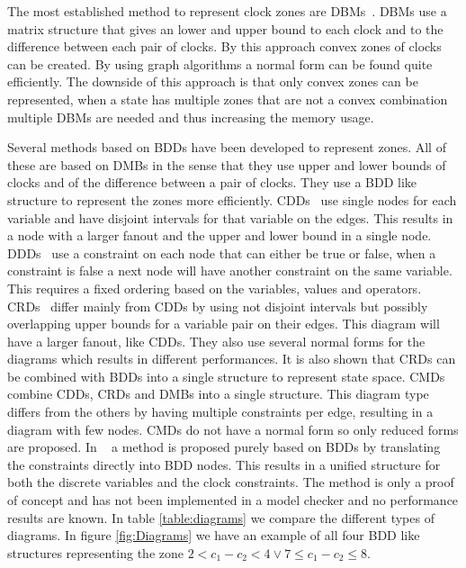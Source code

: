 \documentclass[11pt]{article}
\begin{document}
The most established method to represent clock zones are DBMs~\cite{dbmorig, bengtsson2002clocks}. DBMs use a matrix structure that gives an lower and upper bound to each clock and to the difference between each pair of clocks. By this approach convex zones of clocks can be created. By using graph algorithms a normal form can be found quite efficiently. The downside of this approach is that only convex zones can be represented, when a state has multiple zones that are not a convex combination multiple DBMs are needed and thus increasing the memory usage. 

Several methods based on BDDs have been developed to represent zones. All of these are based on DMBs in the sense that they use upper and lower bounds of clocks and of the difference between a pair of clocks. They use a BDD like structure to represent the zones more efficiently. CDDs~\cite{BRICS19491} use single nodes for each variable and have disjoint intervals for that variable on the edges. This results in a node with a larger fanout and the upper and lower bound in a single node. DDDs~\cite{ddds, ddd-datastructure-99} use a constraint on each node that can either be true or false, when a constraint is false a next node will have another constraint on the same variable. This requires a fixed ordering based on the variables, values and operators. CRDs~\cite{crds} differ mainly from CDDs by using not disjoint intervals but possibly overlapping upper bounds for a variable pair on their edges. This diagram will have a larger fanout, like CDDs. They also use several normal forms for the diagrams which results in different performances. It is also shown that CRDs can be combined with BDDs into a single structure to represent state space. CMDs~\cite{5702245} combine CDDs, CRDs and DMBs into a single structure. This diagram type differs from the others by having multiple constraints per edge, resulting in a diagram with few nodes. CMDs do not have a normal form so only reduced forms are proposed. In ~\cite{7098276, 7184781} a method is proposed purely based on BDDs by translating the constraints directly into BDD nodes. This results in a unified structure for both the discrete variables and the clock constraints. The method is only a proof of concept and has not been implemented in a model checker and no performance results are known. In table \ref{table:diagrams} we compare the different types of diagrams. In figure \ref{fig:Diagrams} we have an example of all four BDD like structures representing the zone $2 < c_1 - c_2 < 4 \vee 7 \leq c_1 - c_2 \leq 8$.
\end{document}
